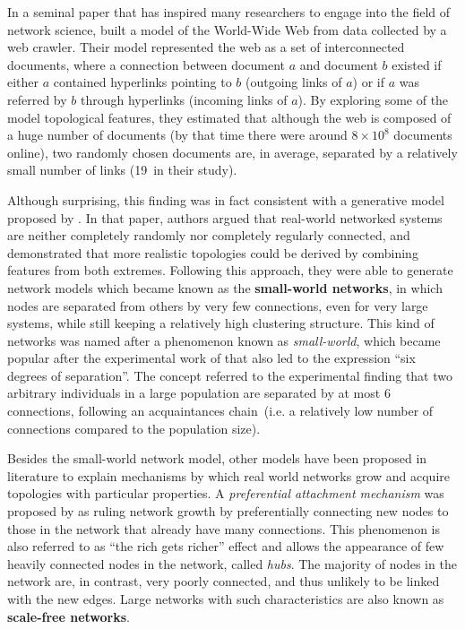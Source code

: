 In a seminal paper that has inspired many researchers to engage into the field of network science,  built a model of the World-Wide Web from data collected by a web crawler. 
Their model represented the web as a set of interconnected documents, where a connection between document $a$ and document $b$ existed if either $a$ contained hyperlinks pointing to $b$ (outgoing links of $a$) or if $a$ was referred by $b$ through hyperlinks (incoming links of $a$).
By exploring some of the model topological features, they estimated that although the web is composed of a huge number of documents (by that time there were around $8 \times 10^8$ documents online), two randomly chosen documents are, in average, separated by a relatively small number of links (19~in their study). 

Although surprising, this finding was in fact consistent with a generative model proposed by .
In that paper, authors argued that real-world networked systems are neither completely randomly nor completely regularly connected, and demonstrated that more realistic topologies could be derived by combining features from both extremes.
Following this approach, they were able to generate network models which became known as the \textbf{small-world networks}, in which nodes are separated from others by very few connections, even for very large systems, while still keeping a relatively high clustering structure.
This kind of networks was named after a phenomenon known as \textit{small-world}, which became popular after the experimental work of  that also led to the expression ``six degrees of separation''.
The concept referred to the experimental finding that two arbitrary individuals in a large population are separated by at most 6 connections, following an acquaintances chain~(i.e. a relatively low number of connections compared to the population size).

Besides the small-world network model, other models have been proposed in literature to explain mechanisms by which real world networks grow and acquire topologies with particular properties.
A \textit{preferential attachment mechanism} was proposed by  as ruling network growth by preferentially connecting new nodes to those in the network that already have many connections.
This phenomenon is also referred to as ``the rich gets richer'' effect and allows the appearance of few heavily connected nodes in the network, called \textit{hubs}. 
The majority of nodes in the network are, in contrast, very poorly connected, and thus unlikely to be linked with the new edges.
Large networks with such characteristics are also known as \textbf{scale-free networks}.

